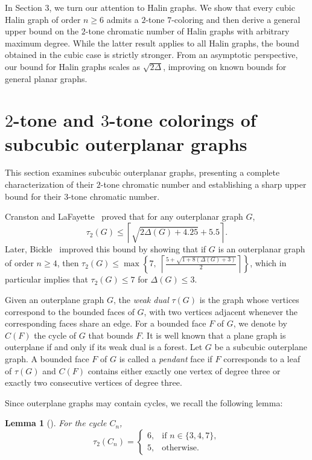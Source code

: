 \documentclass[12pt]{article}
\numberwithin{theorem}{section}
\numberwithin{conjecture}{section}
\numberwithin{corollary}{section}
\numberwithin{example}{section}
\newtheorem{lemma}{Lemma}
\numberwithin{lemma}{section}
\numberwithin{proposition}{section}
\numberwithin{problem}{section}
\numberwithin{remark}{section}
\numberwithin{claim}{theorem}
\numberwithin{definition}{section}
\begin{document}
\noindent In Section $3$, we turn our attention to Halin graphs. We show that every cubic Halin graph of order $n \ge 6$ admits a $2$-tone $7$-coloring and then derive a general upper bound on the $2$-tone chromatic number of Halin graphs with arbitrary maximum degree. While the latter result applies to all Halin graphs, the bound obtained in the cubic case is strictly stronger. From an asymptotic perspective, our bound for Halin graphs scales as $\sqrt{2\Delta}$, improving on known bounds for general planar graphs.

\section{$2$-tone and $3$-tone colorings of subcubic outerplanar graphs}

This section examines subcubic outerplanar graphs, presenting a complete characterization of their $2$-tone chromatic number and establishing a sharp upper bound for their $3$-tone chromatic number.

\noindent Cranston and LaFayette~\cite{C2} proved that for any outerplanar graph $G$, \[
\tau_2(G) \le 
\left\lceil 
\sqrt{2\Delta(G) + 4.25}
+ 5.5
\right\rceil.
 \] Later, Bickle~\cite{B2} improved this bound by showing that if $G$ is an outerplanar graph of order $n \geq 4$, then $\tau_2(G) \le \max\left\{7,\;\left\lceil \frac{5 +\sqrt{1 + 8(\Delta(G) + 3)}}{2} \right\rceil\right\}$, which in particular implies that $\tau_2(G) \le 7$ for $\Delta(G)\le3$.

\noindent Given an outerplane graph $G$, the \emph{weak dual} $\tau(G)$ is the graph whose vertices correspond to the bounded faces of $G$, with two vertices adjacent whenever the corresponding faces share an edge. For a bounded face $F$ of $G$, we denote by $C(F)$ the cycle of $G$ that bounds $F$. It is well known that a plane graph is outerplane if and only if its weak dual is a forest. Let $G$ be a subcubic outerplane graph. A bounded face $F$ of $G$ is called a \emph{pendant} face if $F$ corresponds to a leaf of $\tau(G)$ and $C(F)$ contains either exactly one vertex of degree three or exactly two consecutive vertices of degree three. 

\noindent Since outerplane graphs may contain cycles, we recall the following lemma:

\begin{lemma}[\cite{BP}]\label{l1}
For the cycle $C_n$,
\[
\tau_2(C_n) =
\begin{cases}
6, & \text{if } n \in \{3, 4, 7\},\\
5, & \text{otherwise.}
\end{cases}
\]
\end{lemma}
\end{document}
